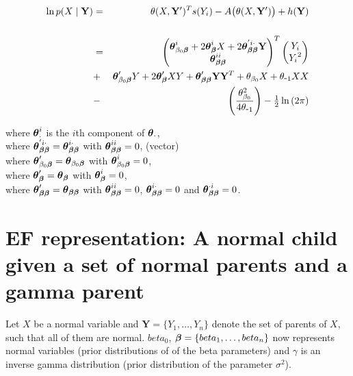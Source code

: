 \documentclass[11pt, oneside]{article}   	%
\numberwithin{figure}{section}
\numberwithin{equation}{section}
\numberwithin{table}{section}
\theoremstyle{definition}
\begin{document}
\begin{appendices}
\begin{itemize}
\begin{eqnarray*}
\ln p(X\mid \mathbf{Y}) &=& \theta(X,\mathbf Y')^T s(Y_i) - A \big(\theta(X,\mathbf Y') \big) + h(\mathbf{Y})\\\\
&=&
\begin{pmatrix}
\boldsymbol \theta_{\beta_0\boldsymbol \beta}^i + 2\boldsymbol \theta_{\boldsymbol \beta}^iX + 2\boldsymbol \theta_{\boldsymbol \beta\boldsymbol \beta}^{'i \cdot}\mathbf Y \\
\boldsymbol \theta_{\boldsymbol \beta\boldsymbol \beta}^{ii} 
\end{pmatrix}^T
\begin{pmatrix}
Y_i\\
{Y_i}^2\\
\end{pmatrix}\\
&+& \boldsymbol \theta_{\beta_0\boldsymbol \beta}'Y + 2\boldsymbol \theta_{\boldsymbol \beta}'XY  + \boldsymbol \theta_{\boldsymbol \beta\boldsymbol \beta}'\mathbf Y\mathbf Y^T + \theta_{\beta_0}X + \theta_{\mbox{-}1}XX \\
&-& \left( \frac{\theta_{\beta_0}^2}{4\theta_{\mbox{-}1}} \right) - \tfrac{1}{2}\ln{(2\pi)}
\end{eqnarray*}

where $\boldsymbol \theta_{\cdot}^i$ is the $i$th component of $\boldsymbol \theta_{\cdot}$,\\
where $\boldsymbol \theta_{\boldsymbol \beta\boldsymbol \beta}^{'i\cdot} = \boldsymbol \theta_{\boldsymbol \beta\boldsymbol \beta}^{i\cdot}$ with $\boldsymbol \theta_{\boldsymbol \beta\boldsymbol \beta}^{ii} = 0$, (vector)\\
where $\boldsymbol \theta_{\beta_0\boldsymbol \beta}' = \boldsymbol \theta_{\beta_0\boldsymbol \beta}$ with $\boldsymbol \theta_{\beta_0\boldsymbol \beta}^i = 0$,\\
where $\boldsymbol \theta_{\boldsymbol \beta}' = \boldsymbol \theta_{\boldsymbol \beta}$ with $\boldsymbol \theta_{\boldsymbol \beta}^i = 0$,\\
where $\boldsymbol \theta_{\boldsymbol \beta\boldsymbol \beta}' = \boldsymbol \theta_{\boldsymbol \beta\boldsymbol \beta}$ with $\boldsymbol \theta_{\boldsymbol \beta\boldsymbol \beta}^{ii} = 0$, $\boldsymbol \theta_{\boldsymbol \beta\boldsymbol \beta}^{i\cdot} = 0$  and $\boldsymbol \theta_{\boldsymbol \beta\boldsymbol \beta}^{\cdot i} = 0$.\\


\end{itemize}

\newpage
\section{EF representation: A normal child given a set of normal parents and a gamma parent}

Let $X$ be a normal variable and $ \mathbf{Y} = \{Y_1,\ldots,Y_n\}$ denote the set of parents of $X$, such that all of them are normal. $beta_0$, $ \boldsymbol \beta = \{beta_1,\ldots,beta_n\}$ now represents normal variables (prior distributions of of the beta parameters) and $\gamma$ is an inverse gamma distribution (prior distribution of the parameter $\sigma^2$).


\end{appendices}
\end{document}
